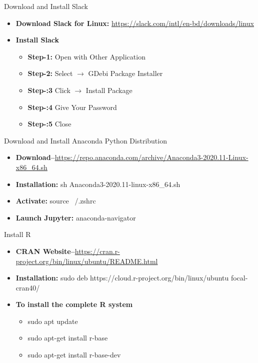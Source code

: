 \begin{frame}[t]{Download and Install Slack}
	\begin{itemize}
		\item \textbf{Download Slack for Linux:} 
		\url{https://slack.com/intl/en-bd/downloads/linux}
		\item \textbf{Install Slack} 
		\begin{itemize}
			\item \textbf{Step-1:}  Open with Other Application 
			\item \textbf{Step-2:}  Select $\rightarrow$ GDebi Package Installer
			\item \textbf{Step-:3}  Click $\rightarrow$ Install Package 
			\item \textbf{Step-:4}  Give Your Password 
			\item \textbf{Step-:5}  Close 
		\end{itemize}
	\end{itemize}
\end{frame}


\begin{frame}[t]{Download and Install Anaconda Python Distribution}
	\begin{itemize}
		\item 
		\textbf{Download--}\url{https://repo.anaconda.com/archive/Anaconda3-2020.11-Linux-x86_64.sh}
		\item \textbf{Installation:} sh Anaconda3-2020.11-linux-x86\_64.sh
		\item \textbf{Activate:} source ~/.zshrc
		\item \textbf{Launch Jupyter:} anaconda-navigator 
	\end{itemize}
\end{frame}

\begin{frame}[t]{Install R}
	\begin{itemize}
		\item 
		\textbf{CRAN 
		Website--}\url{https://cran.r-project.org/bin/linux/ubuntu/README.html}
		\item \textbf{Installation:} sudo deb 
		https://cloud.r-project.org/bin/linux/ubuntu focal-cran40/
		
		\item \textbf{To install the complete R system} 
		\begin{itemize}
			\item sudo apt update
			\item sudo apt-get install r-base
			\item sudo apt-get install r-base-dev
		\end{itemize}
	\end{itemize}
\end{frame}



